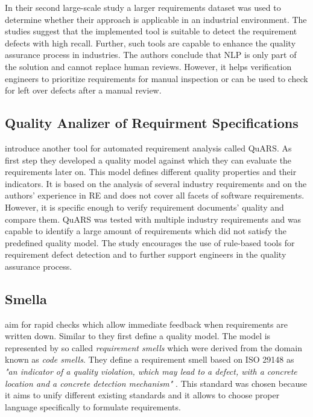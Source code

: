 In their second large-scale study a larger requirements dataset was used to determine whether their approach is applicable in an industrial environment.
The studies suggest that the implemented tool is suitable to detect the requirement defects with high recall.
Further, such tools are capable to enhance the quality assurance process in industries.
The authors conclude that \ac{NLP} is only part of the solution and cannot replace human reviews.
However, it helps verification engineers to prioritize requirements for manual inspection or can be used to check for left over defects after a manual review.

\subsection{Quality Analizer of Requirment Specifications}
\textcite{Fabbrini:2002} introduce another tool for automated requirement analysis called \ac{QuARS}.
As first step they developed a quality model against which they can evaluate the requirements later on.
This model defines different quality properties and their indicators.
It is based on the analysis of several industry requirements and on the authors' experience in \ac{RE} and does not cover all facets of software requirements.
However, it is specific enough to verify requirement documents' quality and compare them.
\Ac{QuARS} was tested with multiple industry requirements and was capable to identify a large amount of requirements which did not satisfy the predefined quality model.
The study encourages the use of rule-based tools for requirement defect detection and to further support engineers in the quality assurance process.

\subsection{Smella}
\textcite{Femmer:2017} aim for rapid checks which allow immediate feedback when requirements are written down.
Similar to \textcite{Fabbrini:2002} they first define a quality model.
The model is represented by so called \textit{requirement smells} which were derived from the domain known as \textit{code smells}.
They define a requirement smell based on ISO 29148 as \textit{"an indicator of a quality violation, which may lead to a defect, with a concrete location and a concrete detection mechanism"} \parencite{Femmer:2017}.
This standard was chosen because it aims to unify different existing standards and it allows to choose proper language specifically to formulate requirements.

